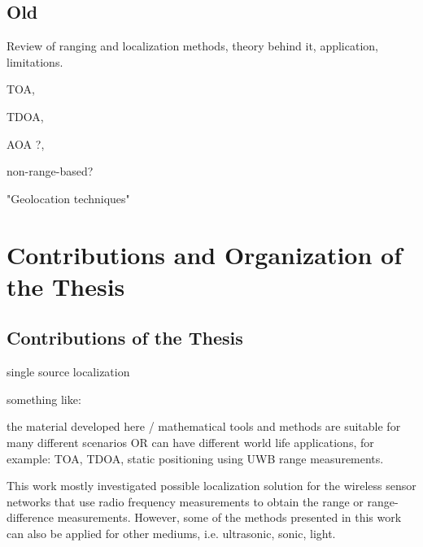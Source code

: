 \subsection{Old}

Review of ranging and localization methods, theory behind it, application, limitations. 

TOA,
 
TDOA,

AOA ?,

non-range-based? 

"Geolocation techniques"

\cite{GeoLoc}
\cite{LiuSurvey}


\section{Contributions and Organization of the Thesis}

\subsection{Contributions  of the Thesis} \label{contributions}
single source localization

something like:

the material developed here / mathematical tools and methods are suitable for many different scenarios 
OR
can have different world life applications, for example: TOA, TDOA, static positioning using UWB range measurements. 

This work mostly investigated possible localization solution for the wireless sensor networks that use radio frequency measurements to obtain the range or range-difference measurements. However, some of the methods presented in this work can also be applied for other mediums, i.e. ultrasonic, sonic, light. 

